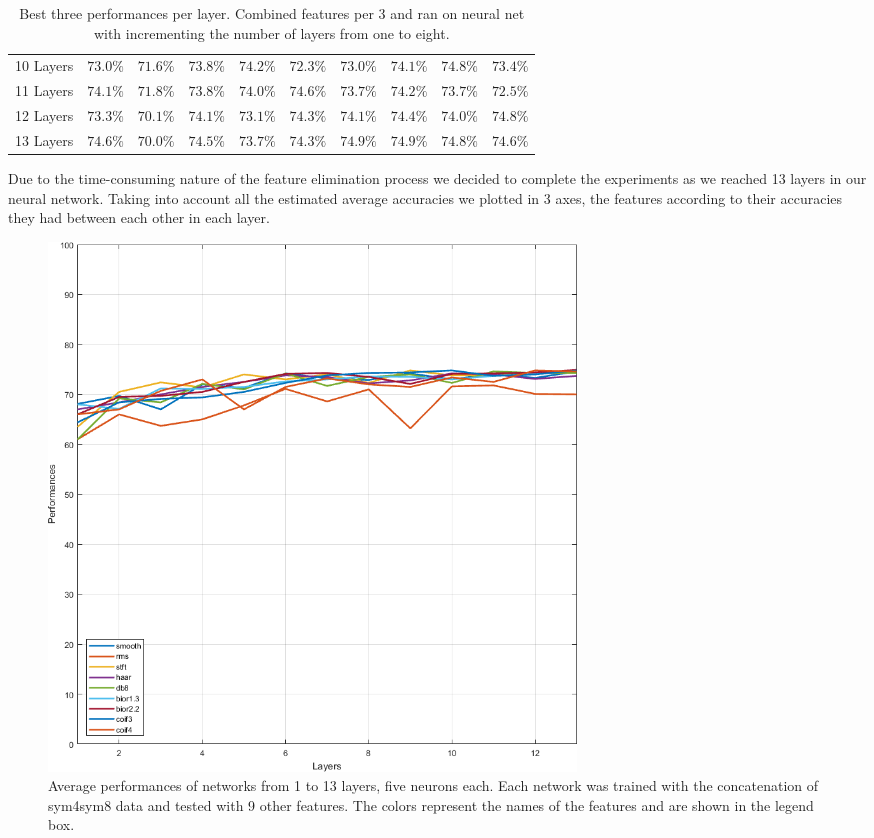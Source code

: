 \begin{table}[h!]
\begin{tabular}{ |p{1.7cm}||p{1.2cm}|p{1cm}|p{1cm}|p{1cm}|p{1cm}|p{1.1cm}|p{1.1cm}|p{1cm}|p{1cm}|}
 10 Layers & $73.0\%$ & $71.6\%$ & $73.8\%$ & \cellcolor{blue!35}$74.2\%$ &$72.3\%$ &$73.0\%$ &\cellcolor{blue!35}$74.1\%$ & \cellcolor{blue!35}$74.8\%$ &$73.4\%$\\
 11 Layers & \cellcolor{blue!35}$74.1\%$ & $71.8\%$ & $73.8\%$ & $74.0\%$ &\cellcolor{blue!35}$74.6\%$ &$73.7\%$ &\cellcolor{blue!35}$74.2\%$ & $73.7\%$ &$72.5\%$\\
 12 Layers & $73.3\%$ & $70.1\%$ & \cellcolor{blue!35}$74.1\%$ & $73.1\%$ & $74.3\%$ & $74.1\%$ & \cellcolor{blue!35}$74.4\%$ & $74.0\%$ & \cellcolor{blue!35}$74.8\%$\\
 13 Layers & $74.6\%$ & $70.0\%$ & $74.5\%$ & $73.7\%$ & $74.3\%$ &\cellcolor{blue!35} $74.9\%$ & \cellcolor{blue!35}$74.9\%$ & \cellcolor{blue!35}$74.8\%$ & $74.6\%$\\
 \hline
\end{tabular}
\caption{Best three performances per layer. Combined features per 3 and ran on neural net with incrementing the number of layers from one to eight.}
\label{table:sym4sym8_1-5layers}
\end{table}
Due to the time-consuming nature of the feature elimination process we decided to complete the experiments as we reached 13 layers in our neural network. Taking into account all the estimated average accuracies we plotted in 3 axes, the features according to their accuracies they had between each other in each layer.
\begin{figure}[h!]
\includegraphics[width=14cm,center,keepaspectratio]{figures/sym4sym8}
   \caption{Average performances of networks from 1 to 13 layers, five neurons each. Each network was trained with the concatenation of sym4sym8 data and tested with 9 other features. The colors represent the names of the features and are shown in the legend box.}
   \label{fig:sym4sym8} 
\end{figure}
